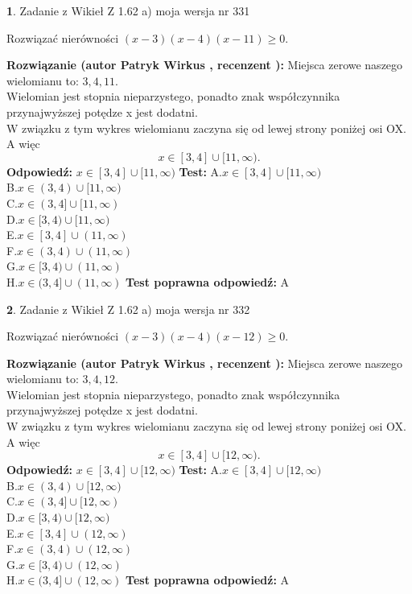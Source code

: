 \documentclass[12pt, a4paper]{article}
\theoremstyle{definition} %
\newtheorem{zad}{}
\newcommand{\zadStart}[1]{\begin{zad}#1\newline}
\newcommand{\zadStop}{\end{zad}}
\newcommand{\rozwStart}[2]{\noindent \textbf{Rozwiązanie (autor #1 , recenzent #2): }\newline}
\newcommand{\rozwStop}{\newline}
\newcommand{\odpStart}{\noindent \textbf{Odpowiedź:}\newline}
\newcommand{\odpStop}{\newline}
\newcommand{\testStart}{\noindent \textbf{Test:}\newline}
\newcommand{\testStop}{\newline}
\newcommand{\kluczStart}{\noindent \textbf{Test poprawna odpowiedź:}\newline}
\newcommand{\kluczStop}{\newline}
\begin{document}
\zadStart{Zadanie z Wikieł Z 1.62 a) moja wersja nr 331}

Rozwiązać nierówności $(x-3)(x-4)(x-11)\ge0$.
\zadStop
\rozwStart{Patryk Wirkus}{}
Miejsca zerowe naszego wielomianu to: $3, 4, 11$.\\
Wielomian jest stopnia nieparzystego, ponadto znak współczynnika przy\linebreak najwyższej potędze x jest dodatni.\\ W związku z tym wykres wielomianu zaczyna się od lewej strony poniżej osi OX. A więc $$x \in [3,4] \cup [11,\infty).$$
\rozwStop
\odpStart
$x \in [3,4] \cup [11,\infty)$
\odpStop
\testStart
A.$x \in [3,4] \cup [11,\infty)$\\
B.$x \in (3,4) \cup [11,\infty)$\\
C.$x \in (3,4] \cup [11,\infty)$\\
D.$x \in [3,4) \cup [11,\infty)$\\
E.$x \in [3,4] \cup (11,\infty)$\\
F.$x \in (3,4) \cup (11,\infty)$\\
G.$x \in [3,4) \cup (11,\infty)$\\
H.$x \in (3,4] \cup (11,\infty)$
\testStop
\kluczStart
A
\kluczStop



\zadStart{Zadanie z Wikieł Z 1.62 a) moja wersja nr 332}

Rozwiązać nierówności $(x-3)(x-4)(x-12)\ge0$.
\zadStop
\rozwStart{Patryk Wirkus}{}
Miejsca zerowe naszego wielomianu to: $3, 4, 12$.\\
Wielomian jest stopnia nieparzystego, ponadto znak współczynnika przy\linebreak najwyższej potędze x jest dodatni.\\ W związku z tym wykres wielomianu zaczyna się od lewej strony poniżej osi OX. A więc $$x \in [3,4] \cup [12,\infty).$$
\rozwStop
\odpStart
$x \in [3,4] \cup [12,\infty)$
\odpStop
\testStart
A.$x \in [3,4] \cup [12,\infty)$\\
B.$x \in (3,4) \cup [12,\infty)$\\
C.$x \in (3,4] \cup [12,\infty)$\\
D.$x \in [3,4) \cup [12,\infty)$\\
E.$x \in [3,4] \cup (12,\infty)$\\
F.$x \in (3,4) \cup (12,\infty)$\\
G.$x \in [3,4) \cup (12,\infty)$\\
H.$x \in (3,4] \cup (12,\infty)$
\testStop
\kluczStart
A
\kluczStop
\end{document}
